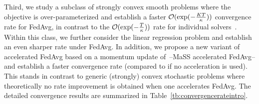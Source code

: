 Third, we study a subclass of strongly convex smooth problems where the objective is over-parameterized and establish 
a faster ${\mathcal{O}}(\exp(-\frac{KT}{\kappa}))$ convergence rate for FedAvg, in contrast to the ${\mathcal{O}}(\exp(-\frac{T}{\kappa}))$ rate for individual solvers~\cite{ma2017power}. Within this class, we further consider the linear regression problem and establish an even sharper rate under FedAvg. In addition, we propose a new variant of accelerated FedAvg based on a momentum update of~\cite{liu2018accelerating}--MaSS accelerated FedAvg--and establish a faster convergence rate (compared to if no acceleration is used). This stands in contrast to generic (strongly) convex stochastic problems where theoretically no rate improvement is obtained when one accelerates FedAvg.
The detailed convergence results are summarized in Table~\ref{tb:convergencerateintro}.


